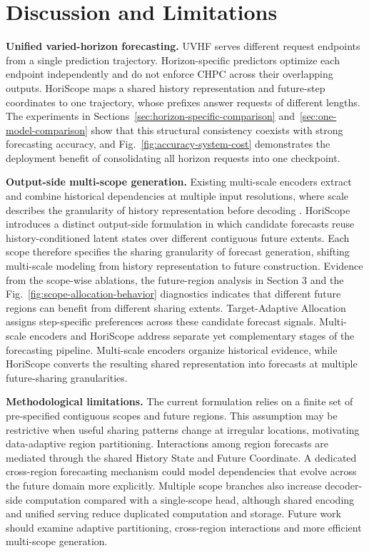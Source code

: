 \section{Discussion and Limitations}
\label{sec:discussion}


\textbf{Unified varied-horizon forecasting.} UVHF serves different request endpoints from a single prediction trajectory. Horizon-specific predictors optimize each endpoint independently and do not enforce CHPC across their overlapping outputs. HoriScope maps a shared history representation and future-step coordinates to one trajectory, whose prefixes answer requests of different lengths. The experiments in Sections~\ref{sec:horizon-specific-comparison} and~\ref{sec:one-model-comparison} show that this structural consistency coexists with strong forecasting accuracy, and Fig.~\ref{fig:accuracy-system-cost} demonstrates the deployment benefit of consolidating all horizon requests into one checkpoint.

\textbf{Output-side multi-scope generation.} Existing multi-scale encoders extract and combine historical dependencies at multiple input resolutions, where scale describes the granularity of history representation before decoding \citep{challu2023nhits,chen2024pathformer,wang2024timemixer}. HoriScope introduces a distinct output-side formulation in which candidate forecasts reuse history-conditioned latent states over different contiguous future extents. Each scope therefore specifies the sharing granularity of forecast generation, shifting multi-scale modeling from history representation to future construction. Evidence from the scope-wise ablations, the future-region analysis in Section 3 and the Fig.~\ref{fig:scope-allocation-behavior} diagnostics indicates that different future regions can benefit from different sharing extents. Target-Adaptive Allocation assigns step-specific preferences across these candidate forecast signals. Multi-scale encoders and HoriScope address separate yet complementary stages of the forecasting pipeline. Multi-scale encoders organize historical evidence, while HoriScope converts the resulting shared representation into forecasts at multiple future-sharing granularities.

\textbf{Methodological limitations.} The current formulation relies on a finite set of pre-specified contiguous scopes and future regions. This assumption may be restrictive when useful sharing patterns change at irregular locations, motivating data-adaptive region partitioning. Interactions among region forecasts are mediated through the shared History State and Future Coordinate. A dedicated cross-region forecasting mechanism could model dependencies that evolve across the future domain more explicitly. Multiple scope branches also increase decoder-side computation compared with a single-scope head, although shared encoding and unified serving reduce duplicated computation and storage. Future work should examine adaptive partitioning, cross-region interactions and more efficient multi-scope generation.
